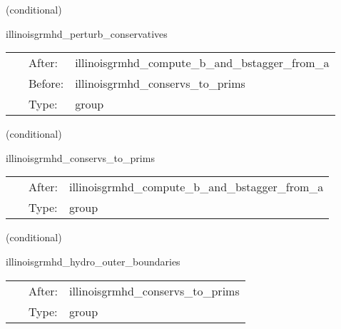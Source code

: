\vspace{5mm}

   (conditional) 

\hspace{5mm} illinoisgrmhd\_perturb\_conservatives 

\hspace{5mm}{\it perturb conservatives before con2prim } 


\hspace{5mm}

 \begin{tabular*}{160mm}{cll} 
~ & After:  & illinoisgrmhd\_compute\_b\_and\_bstagger\_from\_a \\ 
~ & Before:  & illinoisgrmhd\_conservs\_to\_prims \\ 
~ & Type:  & group \\ 
\end{tabular*} 


\vspace{5mm}

   (conditional) 

\hspace{5mm} illinoisgrmhd\_conservs\_to\_prims 

\hspace{5mm}{\it compute primitive variables from conservatives } 


\hspace{5mm}

 \begin{tabular*}{160mm}{cll} 
~ & After:  & illinoisgrmhd\_compute\_b\_and\_bstagger\_from\_a \\ 
~ & Type:  & group \\ 
\end{tabular*} 


\vspace{5mm}

   (conditional) 

\hspace{5mm} illinoisgrmhd\_hydro\_outer\_boundaries 

\hspace{5mm}{\it apply selected boundary conditions to the primitive variables } 


\hspace{5mm}

 \begin{tabular*}{160mm}{cll} 
~ & After:  & illinoisgrmhd\_conservs\_to\_prims \\ 
~ & Type:  & group \\ 
\end{tabular*} 


